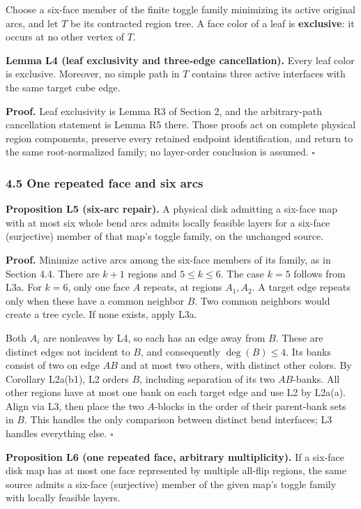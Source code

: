 \documentclass[
  11pt,
]{article}
\newcounter{none} %
\begin{document}
Choose a six-face member of the finite toggle family minimizing its
active original arcs, and let \(T\) be its contracted region tree. A
face color of a leaf is \textbf{exclusive}: it occurs at no other vertex
of \(T\).

\textbf{Lemma L4 (leaf exclusivity and three-edge cancellation).} Every
leaf color is exclusive. Moreover, no simple path in \(T\) contains
three active interfaces with the same target cube edge.

\textbf{Proof.} Leaf exclusivity is Lemma R3 of Section 2, and the
arbitrary-path cancellation statement is Lemma R5 there. Those proofs
act on complete physical region components, preserve every retained
endpoint identification, and return to the same root-normalized family;
no layer-order conclusion is assumed. \(\square\)

\subsubsection{4.5 One repeated face and six
arcs}\label{one-repeated-face-and-six-arcs}

\textbf{Proposition L5 (six-arc repair).} A physical disk admitting a
six-face map with at most six whole bend arcs admits locally feasible
layers for a six-face (surjective) member of that map's toggle family,
on the unchanged source.

\textbf{Proof.} Minimize active arcs among the six-face members of its
family, as in Section 4.4. There are \(k+1\) regions and \(5\le k\le6\).
The case \(k=5\) follows from L3a. For \(k=6\), only one face \(A\)
repeats, at regions \(A_1,A_2\). A target edge repeats only when these
have a common neighbor \(B\). Two common neighbors would create a tree
cycle. If none exists, apply L3a.

Both \(A_i\) are nonleaves by L4, so each has an edge away from \(B\).
These are distinct edges not incident to \(B\), and consequently
\(\deg(B)\le4\). Its banks consist of two on edge \(AB\) and at most two
others, with distinct other colors. By Corollary L2a(b1), L2 orders
\(B\), including separation of its two \(AB\)-banks. All other regions
have at most one bank on each target edge and use L2 by L2a(a). Align
via L3, then place the two \(A\)-blocks in the order of their
parent-bank sets in \(B\). This handles the only comparison between
distinct bend interfaces; L3 handles everything else. \(\square\)

\textbf{Proposition L6 (one repeated face, arbitrary multiplicity).} If
a six-face disk map has at most one face represented by multiple
all-flip regions, the same source admits a six-face (surjective) member
of the given map's toggle family with locally feasible layers.
\end{document}
